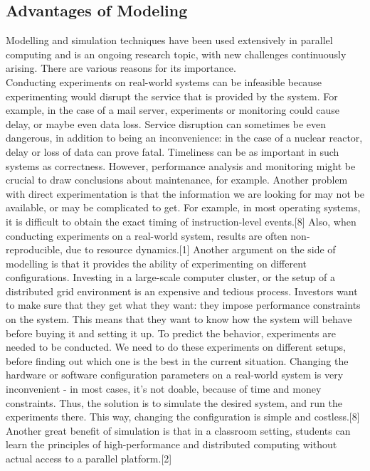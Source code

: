 \subsection{Advantages of Modeling}
Modelling and simulation techniques have been used extensively in
parallel computing and is an ongoing research topic, with new
challenges continuously arising. There are various reasons for its
importance.\\
Conducting experiments on real-world systems can be
infeasible because experimenting would disrupt the service that is
provided by the system. For example, in the case of a mail server,
experiments or monitoring could cause delay, or maybe even data
loss. Service disruption can sometimes be even dangerous, in addition
to being an inconvenience: in the case of a nuclear reactor, delay or
loss of data can prove fatal. Timeliness can be as important in such
systems as correctness. However, performance analysis and monitoring
might be crucial to draw conclusions about maintenance, for
example. Another problem with direct experimentation is that the
information we are looking for may not be available, or may be
complicated to get. For example, in most operating systems, it is
difficult to obtain the exact timing of instruction-level
events.[8] Also, when conducting experiments on a real-world system,
results are often non-reproducible, due to resource dynamics.[1]
Another argument on the side of modelling is that it provides the
ability of experimenting on different
configurations. Investing in a large-scale computer cluster, or the
setup of a distributed grid environment is an expensive and tedious
process. Investors want to make sure that they get what they
want: they impose performance constraints on the system. This means that
they want to know how the system will behave
before buying it and setting it up. To predict the behavior,
experiments are needed to be conducted. We need to do these
experiments on different setups, before finding out which one is the
best in the current situation. Changing the hardware or software
configuration parameters on a real-world system is very inconvenient -
in most cases, it's not doable, because of time and money
constraints. Thus, the solution is to simulate the desired
system, and run the experiments there. This way, changing the
configuration is simple and costless.[8] Another great benefit of
simulation is that in a classroom setting, students can learn the
principles of high-performance and distributed computing without
actual access to a parallel platform.[2]
